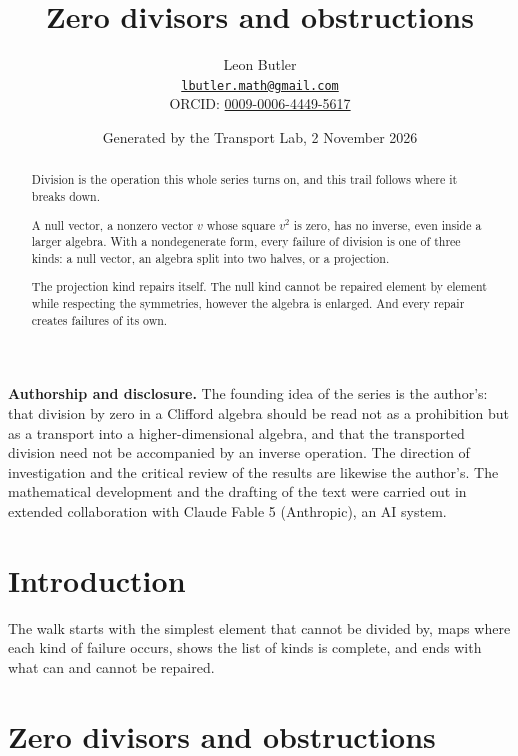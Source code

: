 \documentclass[11pt]{article}
\title{\bfseries Zero divisors and obstructions}
\author{Leon Butler\\ \normalsize\href{mailto:lbutler.math@gmail.com}{\texttt{lbutler.math@gmail.com}}\\ \normalsize ORCID: \href{https://orcid.org/0009-0006-4449-5617}{0009-0006-4449-5617}}
\date{Generated by the Transport Lab, 2 November 2026}
\theoremstyle{definition}
\theoremstyle{plain}
\begin{document}
\maketitle
\begin{abstract}
\normalsize
Division is the operation this whole series turns on, and this trail follows where it breaks down.

A null vector, a nonzero vector $v$ whose square $v^{2}$ is zero, has no inverse, even inside a larger algebra. With a nondegenerate form, every failure of division is one of three kinds: a null vector, an algebra split into two halves, or a projection.

The projection kind repairs itself. The null kind cannot be repaired element by element while respecting the symmetries, however the algebra is enlarged. And every repair creates failures of its own.
\end{abstract}
\newpage
\noindent \textbf{Authorship and disclosure. }The founding idea of the series is the author's: that division by zero in a Clifford algebra should be read not as a prohibition but as a transport into a higher-dimensional algebra, and that the transported division need not be accompanied by an inverse operation. The direction of investigation and the critical review of the results are likewise the author's. The mathematical development and the drafting of the text were carried out in extended collaboration with Claude Fable 5 (Anthropic), an AI system.

\noindent{}
\newpage

\section*{Introduction}
The walk starts with the simplest element that cannot be divided by, maps where each kind of failure occurs, shows the list of kinds is complete, and ends with what can and cannot be repaired.

\section{Zero divisors and obstructions}
\end{document}
